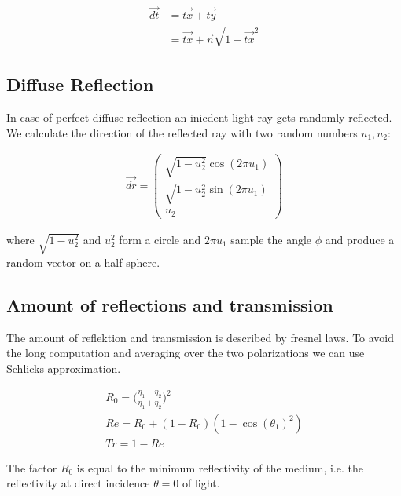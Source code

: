 \documentclass[11pt,a4paper,oneside]{article}
\begin{document}
\begin{align}
\vec{dt} &= \vec{tx} + \vec{ty} \\
&= \vec{tx} + \vec{n} \sqrt{1 - \vec{tx}^2}
\end{align}

\subsection{Diffuse Reflection}

In case of perfect diffuse reflection an inicdent light ray gets randomly reflected. We calculate the direction of the reflected ray with two random numbers $u_1,u_2$:

\begin{align}
\vec{dr} = \begin{pmatrix} \sqrt{1-u_2^2} \cos(2\pi u_1) \\ \sqrt{1-u_2^2} \sin(2\pi u_1) \\ u_2 \end{pmatrix}
\end{align}

where $\sqrt{1-u_2^2}$ and $u_2^2$ form a circle and $2\pi u_1$ sample the angle $\phi$ and produce a random vector on a half-sphere.

\subsection{Amount of reflections and transmission}
The amount of reflektion and transmission is described by fresnel laws. To avoid the long computation and averaging over the two polarizations we can use Schlicks approximation.

\begin{align}
R_0 = \Bigg( \frac{\eta_1 - \eta_2}{\eta_1 + \eta_2} \Bigg) ^2 \\
Re = R_0 + (1-R_0)(1-\cos(\theta_1)^2) \\
Tr = 1 - Re
\end{align}

The factor $R_0$ is equal to the minimum reflectivity of the medium, i.e. the reflectivity at direct incidence $\theta=0$ of light.



\end{document}
